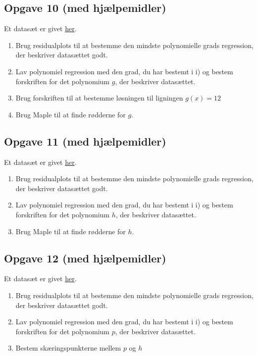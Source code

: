 \documentclass[12pt]{article}
\begin{document}
\subsection*{Opgave 10 (med hjælpemidler)}
	Et datasæt er givet \href{https://github.com/ChristianJLex/TeachingNotes/raw/master/2023-2024/Data og lign/poly_opgave2.xlsx}{\color{blue!60} her}.
	\begin{enumerate}[label=\roman*)]
		\item Brug residualplots til at bestemme den mindste polynomielle grads regression, 
		der beskriver datasættet godt. 
		\item Lav polynomiel regression med den grad, du har bestemt i i) og bestem 
		forskriften for det polynomium $g$, der beskriver datasættet.
		\item Brug forskriften til at bestemme løsningen til ligningen $g(x)=12$
		\item Brug Maple til at finde rødderne for $g$.
	\end{enumerate}
	
\subsection*{Opgave 11 (med hjælpemidler)}
	Et datasæt er givet \href{https://github.com/ChristianJLex/TeachingNotes/raw/master/2023-2024/Data og lign/poly_opgave3.xlsx}{\color{blue!60} her}.
	\begin{enumerate}[label=\roman*)]
		\item Brug residualplots til at bestemme den mindste polynomielle grads regression, 
		der beskriver datasættet godt. 
		\item Lav polynomiel regression med den grad, du har bestemt i i) og bestem 
		forskriften for det polynomium $h$, der beskriver datasættet.
		\item Brug Maple til at finde rødderne for $h$.
	\end{enumerate}

\subsection*{Opgave 12 (med hjælpemidler)}
	Et datasæt er givet \href{https://github.com/ChristianJLex/TeachingNotes/raw/master/2023-2024/Data og lign/poly_opgave4.xlsx}{\color{blue!60} her}.
	\begin{enumerate}[label=\roman*)]
		\item Brug residualplots til at bestemme den mindste polynomielle grads regression, 
		der beskriver datasættet godt. 
		\item Lav polynomiel regression med den grad, du har bestemt i i) og bestem 
		forskriften for det polynomium $p$, der beskriver datasættet.
		\item Bestem skæringspunkterne mellem $p$ og $h$
	\end{enumerate}
	
\end{document}
